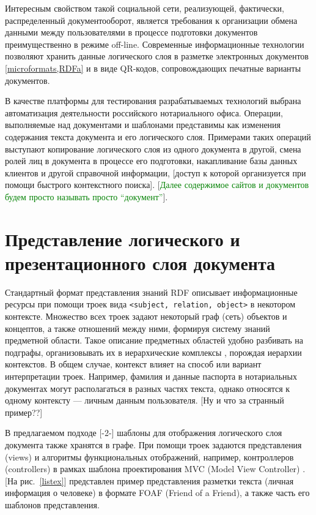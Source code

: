 \documentclass[utf8]{../IncArticle}
\newcommand{\e}[2][fcolor]{\textcolor{pcolor}{[}\textcolor{#1}{#2}\textcolor{pcolor}{]}}
\begin{document}
Интересным свойством такой социальной сети, реализующей, фактически,
распределенный документооборот, является требования к организации
обмена данными между пользователями в процессе подготовки документов
преимущественно в режиме off-line.  Современные информационные
технологии позволяют хранить данные логического слоя в разметке
электронных документов \ref{microformats,RDFa} и в виде QR-кодов,
сопровождающих печатные варианты документов.

В качестве платформы для тестирования разрабатываемых технологий
выбрана автоматизация деятельности российского нотариального
офиса.  Операции, выполняемые над документами и шаблонами представимы
как изменения содержания текста документа и его логического
слоя.  Примерами таких операций выступают копирование логического слоя
из одного документа в другой, смена ролей лиц в документа в процессе
его подготовки, накапливание базы данных клиентов и другой справочной
информации, \e{доступ к которой организуется при помощи быстрого
контекстного поиска}. \e[green]{Далее содержимое сайтов и документов будем
просто называть просто ``документ''}.

\section{Представление логического и презентационного слоя документа}

Стандартный формат представления знаний RDF описывает информационные
ресурсы при помощи троек вида \texttt{<subject, relation, object>} в
некотором контексте.  Множество всех троек задают некоторый граф (сеть)
объектов и концептов, а также отношений между ними, формируя систему
знаний предметной области.  Такое описание предметных областей удобно
разбивать на подграфы, организовывать их в иерархические комплексы
\cite{b4}, порождая иерархии контекстов.  В общем случае, контекст
влияет на способ или вариант интерпретации троек.  Например, фамилия и
данные паспорта в нотариальных документах могут располагаться в разных
частях текста, однако относятся к одному контексту --- личным данным
пользователя.  \e{Ну и что за странный пример??}

В предлагаемом подходе [-2-] шаблоны для отображения логического слоя
документа также хранятся в графе.  При помощи троек задаются
представления (views) и алгоритмы функциональных отображений,
например, контроллеров (controllers) в рамках шаблона проектирования
MVC (Model View Controller) \cite{b2:5}.  \e{На рис.~\ref{listex}}
представлен пример представления разметки текста (личная информация о
человеке) в формате FOAF (Friend of a Friend), а также часть его
шаблонов представления.
\end{document}
